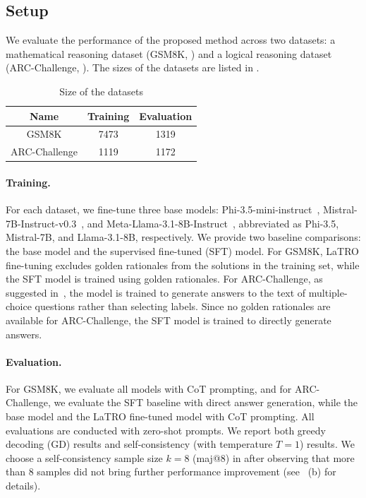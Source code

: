\subsection{Setup}
We evaluate the performance of the proposed method across two datasets: a mathematical reasoning dataset (GSM8K, \citet{cobbe2021training}) and a logical reasoning dataset (ARC-Challenge, \citet{DBLP:conf/naacl/TalmorHLB19}). The sizes of the datasets are listed in .

\begin{table}
    \caption{Size of the datasets}
    \vspace{-1em}
    \label{tab:datasets}
    \begin{center}        
    \def\arraystretch{1}
    \begin{tabular}{c|cc}
        \toprule
        \bf Name & \bf Training & \bf Evaluation \\
        \hline
        GSM8K & 7473 & 1319 \\
        ARC-Challenge & 1119 & 1172 \\
        \bottomrule
    \end{tabular}
    \vspace{-1em}
    \end{center}
\end{table}

\paragraph{Training.}
For each dataset, we fine-tune three base models: Phi-3.5-mini-instruct~\citep{DBLP:journals/corr/abs-2404-14219}, Mistral-7B-Instruct-v0.3~\citep{DBLP:journals/corr/abs-2310-06825}, and Meta-Llama-3.1-8B-Instruct~\citep{DBLP:journals/corr/abs-2407-21783}, abbreviated as Phi-3.5, Mistral-7B, and Llama-3.1-8B, respectively. We provide two baseline comparisons: the base model and the supervised fine-tuned (SFT) model. For GSM8K, LaTRO fine-tuning excludes golden rationales from the solutions in the training set, while the SFT model is trained using golden rationales. For ARC-Challenge, as suggested in~\citep{zheng2024large}, the model is trained to generate answers to the text of multiple-choice questions rather than selecting labels. Since no golden rationales are available for ARC-Challenge, the SFT model is trained to directly generate answers.

\paragraph{Evaluation.}
For GSM8K, we evaluate all models with CoT prompting, and for ARC-Challenge, we evaluate the SFT baseline with direct answer generation, while the base model and the LaTRO fine-tuned model with CoT prompting. All evaluations are conducted with zero-shot prompts. We report both greedy decoding (GD) results and self-consistency (with temperature $T=1$) results. We choose a self-consistency sample size $k=8$ (maj@8) in  after observing that more than 8 samples did not bring further performance improvement (see ~(b) for details).


